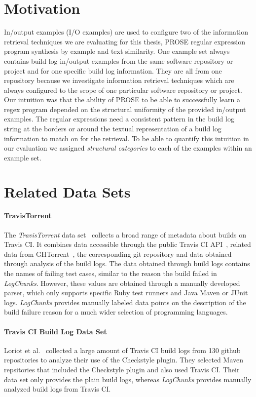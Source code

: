 \documentclass[\myrootdir/main.tex]{subfiles}
\begin{document}
\section{Motivation}
In/output examples (I/O examples) are used to configure two of the information retrieval techniques we are evaluating for this thesis, PROSE regular expression program synthesis by example and text similarity.
One example set always contains build log in/output examples from the same software repository or project and for one specific build log information. They are all from one repository because we investigate information retrieval techniques which are always configured to the scope of one particular software repository or project.
Our intuition was that the ability of PROSE to be able to successfully learn a regex program depended on the structural uniformity of the provided in/output examples.
The regular expressions need a consistent pattern in the build log string at the borders or around the textual representation of a build log information to match on for the retrieval.
To be able to quantify this intuition in our evaluation we assigned \emph{structural categories} to each of the examples within an example set.

\section{Related Data Sets}

\paragraph{TravisTorrent}
The \emph{TravisTorrent} data set~\cite{beller2017travistorrent} collects a broad range of metadata about builds on Travis CI\@.
It combines data accessible through the public Travis CI API~\cite{travisci2019apidoc}, related data from GHTorrent~\cite{gousios2013ghtorrent}, the corresponding git repository and data obtained through analysis of the build logs.
The data obtained through build logs contains the names of failing test cases, similar to the reason the build failed in \emph{LogChunks}.
However, these values are obtained through a manually developed parser, which only supports specific Ruby test runners and Java Maven or JUnit logs.
\emph{LogChunks} provides manually labeled data points on the description of the build failure reason for a much wider selection of programming languages.

\paragraph{Travis CI Build Log Data Set}
Loriot et al.~\cite{loriot2019dataset, loriot2019styler} collected a large amount of Travis CI build logs from 130 github repositories to analyze their use of the Checkstyle plugin.
They selected Maven repsitories that included the Checkstyle plugin and also used Travis CI\@.
Their data set only provides the plain build logs, whereas \emph{LogChunks} provides manually analyzed build logs from Travis CI\@.
\end{document}
